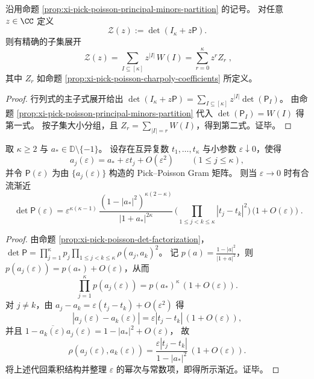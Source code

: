 \begin{proposition}[主子式气体的配分函数行列式表示]\label{prop:xi-pick-poisson-partition-function-determinant}
沿用命题 \ref{prop:xi-pick-poisson-principal-minors-partition} 的记号。
对任意 \(z\in\CC\) 定义
\[
\mathcal{Z}(z):=\det(I_\kappa+z\mathsf P).
\]
则有精确的子集展开
\[
\boxed{\;
\mathcal{Z}(z)=\sum_{I\subseteq[\kappa]} z^{|I|}\,W(I)
=\sum_{r=0}^{\kappa} z^{r}Z_r\; } ,
\]
其中 \(Z_r\) 如命题 \ref{prop:xi-pick-poisson-charpoly-coefficients} 所定义。
\end{proposition}
\begin{proof}
行列式的主子式展开给出
\(
\det(I_\kappa+z\mathsf P)=\sum_{I\subseteq[\kappa]} z^{|I|}\det(\mathsf P_I)
\)。
由命题 \ref{prop:xi-pick-poisson-principal-minors-partition} 代入 \(\det(\mathsf P_I)=W(I)\) 得第一式。
按子集大小分组，且 \(Z_r=\sum_{|I|=r}W(I)\)，得到第二式。证毕。
\end{proof}

\begin{proposition}\label{prop:xi-pick-poisson-confluent-vandermonde}
取 \(\kappa\ge2\) 与 \(a_\ast\in\mathbb{D}\setminus\{-1\}\)。
设存在互异复数 \(t_1,\dots,t_\kappa\) 与小参数 \(\varepsilon\downarrow0\)，使得
\[
a_j(\varepsilon)=a_\ast+\varepsilon t_j+O(\varepsilon^2)\qquad (1\le j\le\kappa),
\]
并令 \(\mathsf P(\varepsilon)\) 为由 \(\{a_j(\varepsilon)\}\) 构造的 Pick--Poisson Gram 矩阵。
则当 \(\varepsilon\to0\) 时有合流渐近
\[
\boxed{\;
\det\mathsf P(\varepsilon)
=\varepsilon^{\kappa(\kappa-1)}\,
\frac{(1-|a_\ast|^2)^{\kappa(2-\kappa)}}{|1+a_\ast|^{2\kappa}}\,
\Biggl(\prod_{1\le j<k\le\kappa}|t_j-t_k|^2\Biggr)\,
\bigl(1+O(\varepsilon)\bigr)\; } .
\]
\end{proposition}
\begin{proof}
由命题 \ref{prop:xi-pick-poisson-det-factorization}，
\(
\det\mathsf P=\prod_{j=1}^{\kappa}p_j\prod_{1\le j<k\le\kappa}\rho(a_j,a_k)^2
\)。
记 \(p(a)=\frac{1-|a|^2}{|1+a|^2}\)，则 \(p(a_j(\varepsilon))=p(a_\ast)+O(\varepsilon)\)，从而
\[
\prod_{j=1}^{\kappa}p(a_j(\varepsilon))=p(a_\ast)^\kappa\,(1+O(\varepsilon)).
\]
对 \(j\ne k\)，由 \(a_j-a_k=\varepsilon(t_j-t_k)+O(\varepsilon^2)\) 得
\[
|a_j(\varepsilon)-a_k(\varepsilon)|=\varepsilon|t_j-t_k|\,(1+O(\varepsilon)),
\]
并且
\(
1-\overline{a_k(\varepsilon)}a_j(\varepsilon)=1-|a_\ast|^2+O(\varepsilon)
\)，
故
\[
\rho(a_j(\varepsilon),a_k(\varepsilon))
=\frac{\varepsilon|t_j-t_k|}{1-|a_\ast|^2}\,(1+O(\varepsilon)).
\]
将上述代回乘积结构并整理 \(\varepsilon\) 的幂次与常数项，即得所示渐近。证毕。
\end{proof}

